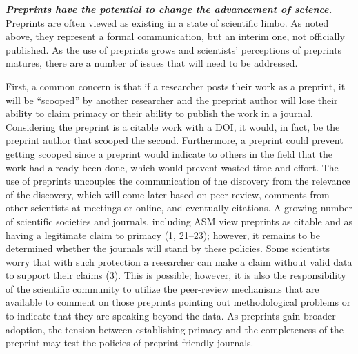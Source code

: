 \documentclass[11,]{article}
\begin{document}
\textbf{\emph{Preprints have the potential to change the advancement of
science.}} Preprints are often viewed as existing in a state of
scientific limbo. As noted above, they represent a formal communication,
but an interim one, not officially published. As the use of preprints
grows and scientists' perceptions of preprints matures, there are a
number of issues that will need to be addressed.

First, a common concern is that if a researcher posts their work as a
preprint, it will be ``scooped'' by another researcher and the preprint
author will lose their ability to claim primacy or their ability to
publish the work in a journal. Considering the preprint is a citable
work with a DOI, it would, in fact, be the preprint author that scooped
the second. Furthermore, a preprint could prevent getting scooped since
a preprint would indicate to others in the field that the work had
already been done, which would prevent wasted time and effort. The use
of preprints uncouples the communication of the discovery from the
relevance of the discovery, which will come later based on peer-review,
comments from other scientists at meetings or online, and eventually
citations. A growing number of scientific societies and journals,
including ASM view preprints as citable and as having a legitimate claim
to primacy (1, 21--23); however, it remains to be determined whether the
journals will stand by these policies. Some scientists worry that with
such protection a researcher can make a claim without valid data to
support their claims (3). This is possible; however, it is also the
responsibility of the scientific community to utilize the peer-review
mechanisms that are available to comment on those preprints pointing out
methodological problems or to indicate that they are speaking beyond the
data. As preprints gain broader adoption, the tension between
establishing primacy and the completeness of the preprint may test the
policies of preprint-friendly journals.
\end{document}
